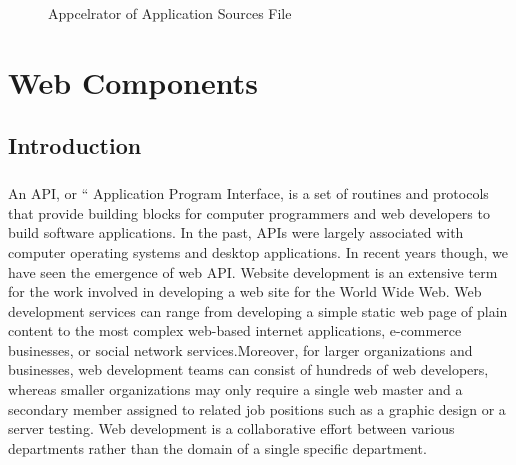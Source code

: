 \documentclass[12pt,a4paper,class,twoside,openany]{report}
\begin{document}
{\begin{figure}
\begin{center}
\caption{Appcelrator of Application Sources File}
\label{fg:3-12}
\end{center}
\end{figure}
\cleardoublepage
\chapter{Web Components}
\section{Introduction}

\paragraph*{\hspace{.9 cm} }  An API, or “ Application Program Interface, is a set of routines and protocols that provide    building blocks for computer programmers and web developers to build software applications. In the past, APIs were largely associated with computer operating systems and desktop applications. In recent years though, we have seen the emergence of web API. Website development is an extensive term for the work involved in developing a web site for the World Wide Web. Web development services can range from developing a simple static web page of plain content to the most complex web-based internet applications, e-commerce businesses, or social network services.Moreover, for larger organizations and businesses, web development teams can consist of hundreds of web developers, whereas smaller organizations may only require a single web master and a secondary member assigned to related job positions such as a graphic design or a server testing. Web development is a collaborative effort between various departments rather than the domain of a single specific department.
}
\end{document}
